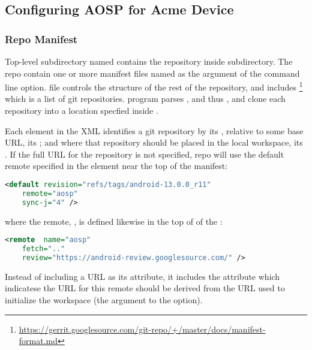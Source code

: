 \subsection{Configuring AOSP for Acme Device}
\label{task:20231118_aosp_hal}


\subsubsection*{Repo Manifest}

Top-level subdirectory named  contains the  repository inside  subdirectory. The  repo contain one or more manifest files named as the argument of the  command line option.  file controls the structure of the rest of the repository, and includes \footnote{\url{https://gerrit.googlesource.com/git-repo/+/master/docs/manifest-format.md}} which is a list of git repositories.  program parses , and thus , and clone each repository into a location specfied inside .

Each  element in the XML identifies a git repository by its , relative to some base URL, its ; and where that repository should be placed in the local workspace, its . If the full URL for the repository is not specified, repo will use the default remote specified in the  element near the top of the manifest:
\begin{lstlisting}[language=xml]
<default revision="refs/tags/android-13.0.0_r11"
    remote="aosp"
    sync-j="4" />
\end{lstlisting}
where the remote, , is defined likewise in the top of of the :
\begin{lstlisting}[language=xml]
<remote  name="aosp"
    fetch=".."
    review="https://android-review.googlesource.com/" />
\end{lstlisting}
Instead of including a URL as its attribute, it includes the  attribute which indicatese the URL for this remote should be derived from the URL used to initialize the workspace (the argument to the  option).




